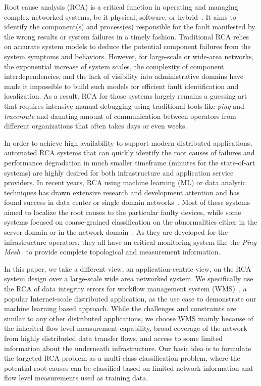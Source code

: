 Root cause analysis (RCA) is a critical function in operating and managing complex networked systems, be it physical, software, or hybrid~\cite{RCA-Review-2017}.
It aims to identify the component(s) and process(es) responsible for the fault manifested by the wrong results or system failures in a timely fashion.
Traditional RCA relies on accurate system models to deduce the potential component failures from the system symptoms and behaviors.
However,  for large-scale or wide-area networks, the exponential increase of system scales, the complexity of component interdependencies, and the lack of 
visibility into administrative domains have made it impossible to build such models for efficient fault identification and localization. 
As a result, RCA for those systems largely remains a guessing art that requires intensive manual debugging using traditional tools 
like {\it ping} and {\it traceroute} and daunting amount of communication between operators from different organizations 
that often takes days or even weeks.

In order to achieve high availability to support modern distributed applications, automated RCA systems that can quickly identify the root causes of failures 
and performance degradation in much smaller timeframe (minutes for the state-of-art systems) are highly desired for both infrastructure and application service providers. 
In recent years, RCA using machine learning (ML) or data analytic techniques has drawn extensive research and development attention and has found success
 in data center or single domain networks~\cite{netbouncer:nsdi18,Link-JIoT-2019}. Most of these systems aimed to localize the root causes 
 to the particular faulty devices, while some systems focused on coarse-grained classification on the abnormalities either in the server domain or 
 in the network domain~\cite{NetPoirot:Sigcomm2016}. As they are developed for the infrastructure operators, they all have an critical monitoring 
 system like the {\it Ping Mesh}~\cite{guo2015pingmesh} to provide complete topological and measurement information. 

In this paper, we take a different view, an application-centric view, on the RCA system design over a large-scale wide area networked system. 
We specifically use the RCA of data integrity errors for workflow management system (WMS)~\cite{deelman-fgcs-2015}, a popular Internet-scale distributed application, as the use case to 
demonstrate our machine learning based approach. While the challenges and constraints are similar to any other distributed applications, 
we choose WMS mainly because of the inherited flow level measurement capability, broad coverage of the network 
from highly distributed data transfer flows, and access to some limited information about the underneath infrastructure. 
Our basic idea is to formulate the targeted RCA problem as a multi-class classification problem, 
where the potential root causes can be classified based on limited network information and flow level measurements used as training data.  

